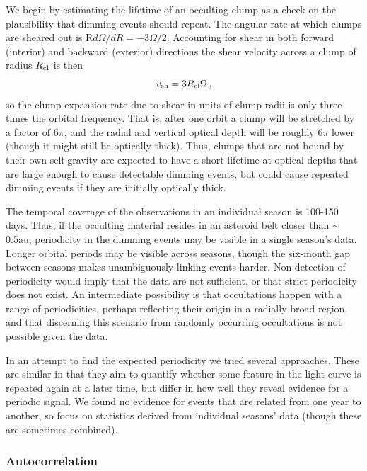 \documentclass[]{rsos}
\begin{document}
We begin by estimating the lifetime of an occulting clump as a check on the plausibility
that dimming events should repeat. The angular rate at which clumps are sheared
  out is R$d \Omega / dR = - 3 \Omega / 2$. Accounting for shear in both forward
  (interior) and backward (exterior) directions the shear velocity across a clump of
  radius $R_{\rm cl}$ is then
\begin{equation}\label{eq:shear}
  v_{\rm sh} = 3 R_{\rm cl} \Omega \, ,
\end{equation}
so the clump expansion rate due to shear in units of clump radii is only three times the
orbital frequency. That is, after one orbit a clump will be stretched by a factor of
$6\pi$, and the radial and vertical optical depth will be roughly $6\pi$ lower (though it
might still be optically thick). Thus, clumps that are not bound by their own
self-gravity are expected to have a short lifetime at optical depths that are large
enough to cause detectable dimming events, but could cause repeated dimming events if
they are initially optically thick.

The temporal coverage of the observations in an individual season is 100-150 days. Thus,
if the occulting material resides in an asteroid belt closer than $\sim$0.5au,
periodicity in the dimming events may be visible in a single season's data. Longer
orbital periods may be visible across seasons, though the six-month gap between seasons
makes unambiguously linking events harder. Non-detection of periodicity would imply that
the data are not sufficient, or that strict periodicity does not exist. An intermediate
possibility is that occultations happen with a range of periodicities, perhaps reflecting
their origin in a radially broad region, and that discerning this scenario from randomly
occurring occultations is not possible given the data.

In an attempt to find the expected periodicity we tried several approaches. These are
similar in that they aim to quantify whether some feature in the light curve is repeated
again at a later time, but differ in how well they reveal evidence for a periodic
signal. We found no evidence for events that are related from one year to another, so
focus on statistics derived from individual seasons' data (though these are sometimes
combined).

\subsubsection{Autocorrelation}\label{sss:auto}
\end{document}
